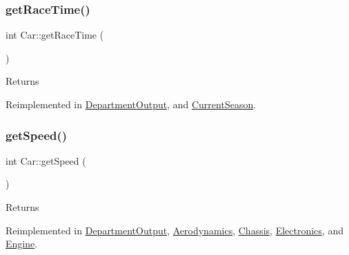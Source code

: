 \mbox{\label{classCar_ac30e13eba209c1ca3bba99bf6741094a}} 
\subsubsection{\texorpdfstring{get\+Race\+Time()}{getRaceTime()}}
{\footnotesize\ttfamily int Car\+::get\+Race\+Time (\begin{DoxyParamCaption}{ }\end{DoxyParamCaption})\hspace{0.3cm}{\ttfamily [virtual]}}

\begin{DoxyReturn}{Returns}

\end{DoxyReturn}


Reimplemented in \hyperlink{classDepartmentOutput_af4807c0cdde8488cd922be5d15a0f59b}{Department\+Output}, and \hyperlink{classCurrentSeason_a15328f2c4192d344e970ce111a96946f}{Current\+Season}.

\mbox{\label{classCar_a18e48b5cf9815216b8e82351d36b8d9f}} 
\subsubsection{\texorpdfstring{get\+Speed()}{getSpeed()}}
{\footnotesize\ttfamily int Car\+::get\+Speed (\begin{DoxyParamCaption}{ }\end{DoxyParamCaption})\hspace{0.3cm}{\ttfamily [virtual]}}

\begin{DoxyReturn}{Returns}

\end{DoxyReturn}


Reimplemented in \hyperlink{classDepartmentOutput_a90caf8934a687d18b9855f19a421ecef}{Department\+Output}, \hyperlink{classAerodynamics_aeee4abded0da2a826af0f3a4c0cdf991}{Aerodynamics}, \hyperlink{classChassis_a095c63aa079ebd8d7fc04f238fd1e56c}{Chassis}, \hyperlink{classElectronics_a09912c940a0a8656d97f8597b766c0eb}{Electronics}, and \hyperlink{classEngine_a5f828ac1355f02d43f8bae90fbddb131}{Engine}.

\mbox{\label{classCar_ae502eb1c04753317ebdb759497fd030c}} 
